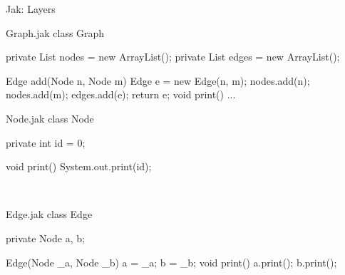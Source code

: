 \begin{frame}[fragile]{Jak: Layers}
	\begin{mycolumns}[widths={60,40},animation=none]
	\mynextcolumn
		\vspace{-1.5cm}\begin{flushright}\end{flushright}
	\end{mycolumns}
	\begin{mycolumns}[columns=3,widths={43,27,30},animation=none]
\begin{codetight}{Graph.jak}
class Graph {
	private List nodes = new ArrayList();
	private List edges = new ArrayList();
	
	Edge add(Node n, Node m) {
		Edge e = new Edge(n, m);
		nodes.add(n); nodes.add(m); edges.add(e);
		return e;
	}
	void print() { ... }
}
\end{codetight}		
	\mynextcolumn
\begin{codetight}{Node.jak}
class Node {
	private int id = 0;

	void print() {
		System.out.print(id);
	}
}
~
~
~
~
~
\end{codetight}
	\mynextcolumn
\begin{codetight}{Edge.jak}
class Edge {
	private Node a, b;
	
	Edge(Node _a, Node _b) {
		a = _a; b = _b;
	}
	void print() {
		a.print(); b.print();
	}
}
~
~
\end{codetight}			
	\end{mycolumns}
\end{frame}

